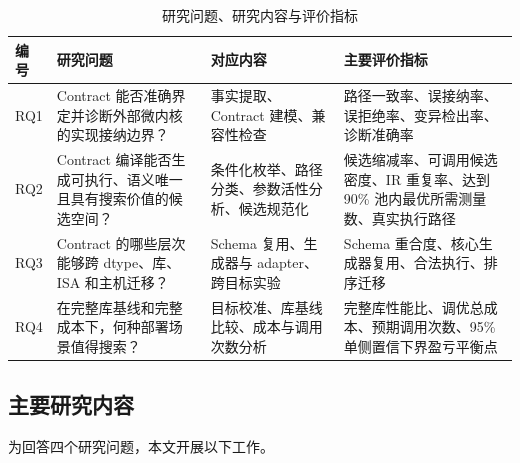 \begin{table}[!htbp]
  \centering
  \caption{研究问题、研究内容与评价指标}
  \label{tab:chapter1-rq-map}
  \begingroup
  \begin{tabularx}{\textwidth}{
    @{}
    >{\centering\arraybackslash}p{}
    >{\raggedright\arraybackslash}X
    >{\raggedright\arraybackslash}p{}
    >{\raggedright\arraybackslash}p{}
    @{}
  }
    \toprule
    \textbf{编号} & \textbf{研究问题} & \textbf{对应内容} & \textbf{主要评价指标} \\
    \midrule
    RQ1 & Contract 能否准确界定并诊断外部微内核的实现接纳边界？
      & 事实提取、Contract 建模、兼容性检查
      & 路径一致率、误接纳率、误拒绝率、变异检出率、诊断准确率 \\
    RQ2 & Contract 编译能否生成可执行、语义唯一且具有搜索价值的候选空间？
      & 条件化枚举、路径分类、参数活性分析、候选规范化
      & 候选缩减率、可调用候选密度、IR 重复率、达到 90\% 池内最优所需测量数、真实执行路径 \\
    RQ3 & Contract 的哪些层次能够跨 dtype、库、ISA 和主机迁移？
      & Schema 复用、生成器与 adapter、跨目标实验
      & Schema 重合度、核心生成器复用、合法执行、排序迁移 \\
    RQ4 & 在完整库基线和完整成本下，何种部署场景值得搜索？
      & 目标校准、库基线比较、成本与调用次数分析
      & 完整库性能比、调优总成本、预期调用次数、95\% 单侧置信下界盈亏平衡点 \\
    \bottomrule
  \end{tabularx}
  \endgroup
\end{table}

\subsection{主要研究内容}

为回答四个研究问题，本文开展以下工作。

